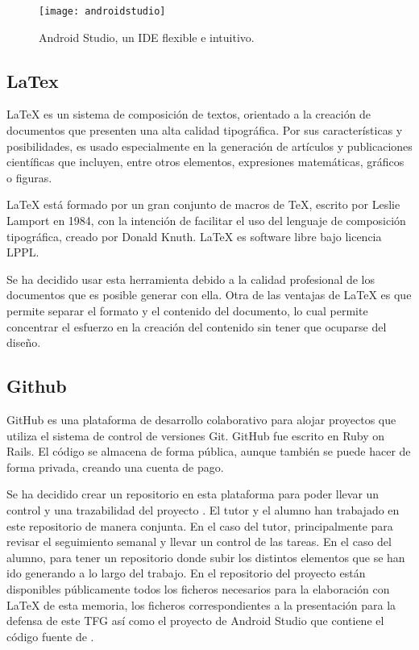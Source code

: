 \begin{figure}[h]
    \centering
    \texttt{[image: androidstudio]}
    \caption{Android Studio, un IDE flexible e intuitivo.}
    \label{fig:androidstudio}
\end{figure}

\subsection{LaTex}

LaTeX \cite{URL::LaTeX} es un sistema de composición de textos, orientado a la creación de documentos que presenten una alta calidad tipográfica. Por sus características y posibilidades, es usado especialmente en la generación de artículos y publicaciones científicas que incluyen, entre otros elementos, expresiones matemáticas, gráficos o figuras.

LaTeX está formado por un gran conjunto de macros de TeX, escrito por Leslie Lamport en 1984, con la intención de facilitar el uso del lenguaje de composición tipográfica, creado por Donald Knuth. LaTeX es software libre bajo licencia LPPL.

Se ha decidido usar esta herramienta debido a la calidad profesional de los documentos que es posible generar con ella. 
Otra de las ventajas de LaTeX es que permite separar el formato y el contenido del documento, lo cual permite concentrar el esfuerzo en la creación del contenido sin tener que ocuparse del diseño. 

\vskip 0.5in

\subsection{Github}

GitHub \cite{URL::Github} es una plataforma de desarrollo colaborativo para alojar proyectos que utiliza el sistema de control de versiones Git. 
GitHub fue escrito en Ruby on Rails. 
El código se almacena de forma pública, aunque también se puede hacer de forma privada, creando una cuenta de pago.

Se ha decidido crear un repositorio \cite{URL::repositorioAplicacion} en esta plataforma para poder llevar un control y una trazabilidad del proyecto \ULLAR{}. 
El tutor y el alumno han trabajado en este repositorio de manera conjunta. 
En el caso del tutor, principalmente para revisar el seguimiento semanal y llevar un control de las tareas. 
En el caso del alumno, para tener un repositorio donde subir los distintos elementos que se han ido generando a lo largo del trabajo. 
En el repositorio del proyecto \cite{URL::repositorioAplicacion} están disponibles públicamente todos los ficheros necesarios para la elaboración con LaTeX de esta memoria, 
los ficheros correspondientes a la
presentación para la defensa de este TFG así como el proyecto de Android Studio que contiene el código fuente de \ULLAR{}. 

